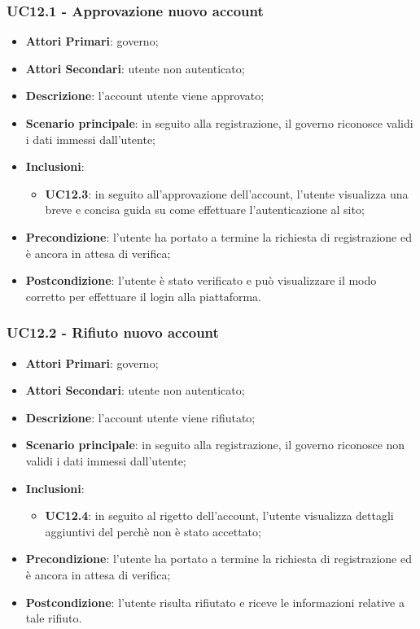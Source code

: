 \subsubsection{UC12.1 - Approvazione nuovo account}
\begin{itemize}
	\item \textbf{Attori Primari}:
	governo;
	\item \textbf{Attori Secondari}:
	utente non autenticato;
	\item \textbf{Descrizione}: l'account utente viene approvato;
	\item \textbf{Scenario principale}: in seguito alla registrazione, il governo riconosce validi i dati immessi dall'utente;
	\item \textbf{Inclusioni}:
	\begin{itemize}
		\item \textbf{UC12.3}: in seguito all'approvazione dell'account, l'utente visualizza una breve e concisa guida su come effettuare l'autenticazione al sito;
	\end{itemize}
	\item \textbf{Precondizione}: l'utente ha portato a termine la richiesta di registrazione ed è ancora in attesa di verifica;
	\item \textbf{Postcondizione}: l'utente è stato verificato e può visualizzare il modo corretto per effettuare il login alla piattaforma.
	
\end{itemize}
\subsubsection{UC12.2 - Rifiuto nuovo account}
\begin{itemize}
	\item \textbf{Attori Primari}:
	governo;
	\item \textbf{Attori Secondari}:
	utente non autenticato;
	\item \textbf{Descrizione}: l'account utente viene rifiutato;
	\item \textbf{Scenario principale}: in seguito alla registrazione, il governo riconosce non validi i dati immessi dall'utente;
	\item \textbf{Inclusioni}:
	\begin{itemize}
		\item \textbf{UC12.4}: in seguito al rigetto  dell'account, l'utente visualizza dettagli aggiuntivi del perchè non è stato accettato;
	\end{itemize}
	\item \textbf{Precondizione}: l'utente ha portato a termine la richiesta di registrazione ed è ancora in attesa di verifica;
	\item \textbf{Postcondizione}: l'utente risulta rifiutato e riceve le informazioni relative a tale rifiuto.
	
\end{itemize}
